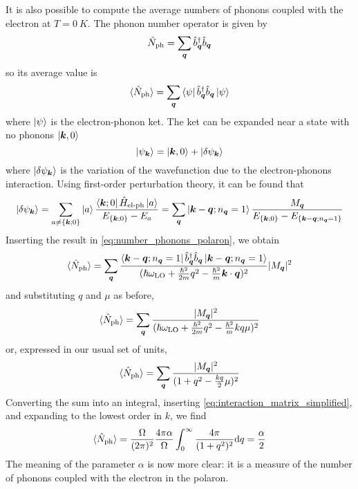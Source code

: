 It is also possible to compute the average numbers of phonons coupled with the electron at $T = \SI{0}{K}$. The phonon number operator is given by
\begin{equation}
    \hat{N}_\text{ph} = \sum_{\mathbf{\boldsymbol{q}}} \hat{b}^\dagger_{\mathbf{\boldsymbol{q}}} \hat{b}_{\mathbf{\boldsymbol{q}}}
\end{equation}
so its average value is
\begin{equation} \label{eq:number_phonons_polaron}
    \langle \hat{N}_\text{ph} \rangle = \sum_{\mathbf{\boldsymbol{q}}} \bra{\psi} \hat{b}^\dagger_{\mathbf{\boldsymbol{q}}} \hat{b}_{\mathbf{\boldsymbol{q}}} \ket{\psi}
\end{equation}
where $\ket{\psi}$ is the electron-phonon ket. The ket can be expanded near a state with no phonons $\ket{\mathbf{\boldsymbol{k}}, 0}$
\begin{equation}
    \ket{\psi_{\mathbf{\boldsymbol{k}}}} = \ket{\mathbf{\boldsymbol{k}}, 0} + \ket{\delta\psi_{\mathbf{\boldsymbol{k}}}}
\end{equation}
where $\ket{\delta\psi_{\mathbf{\boldsymbol{k}}}}$ is the variation of the wavefunction due to the electron-phonons interaction. Using first-order perturbation theory, it can be found that
\begin{equation} \label{eq:sum_integral}
    \ket{\delta\psi_{\mathbf{\boldsymbol{k}}}} = \sum_{a \neq \{\mathbf{\boldsymbol{k}};0\}} \ket{a} \frac{\bra{\mathbf{\boldsymbol{k}};0} \hat{H}_\text{el-ph} \ket{a}}{E_{\{\mathbf{\boldsymbol{k}};0\}} - E_a}
    = \sum_{\mathbf{\boldsymbol{q}}} \ket{\mathbf{\boldsymbol{k}}-\mathbf{\boldsymbol{q}};n_{\mathbf{\boldsymbol{q}}}=1} \frac{M_{\mathbf{\boldsymbol{q}}}}{E_{\{\mathbf{\boldsymbol{k}};0\}} - E_{\{\mathbf{\boldsymbol{k}}-\mathbf{\boldsymbol{q}};n_{\mathbf{\boldsymbol{q}}}=1\}}}
\end{equation}
Inserting the result in \cref{eq:number_phonons_polaron}, we obtain
\begin{equation}
    \langle \hat{N}_\text{ph} \rangle = \sum_{\mathbf{\boldsymbol{q}}} \frac{\bra{\mathbf{\boldsymbol{k}}-\mathbf{\boldsymbol{q}};n_{\mathbf{\boldsymbol{q}}}=1} \hat{b}^\dagger_{\mathbf{\boldsymbol{q}}} \hat{b}_{\mathbf{\boldsymbol{q}}} \ket{\mathbf{\boldsymbol{k}}-\mathbf{\boldsymbol{q}};n_{\mathbf{\boldsymbol{q}}}=1}}{(\hslash\omega_\text{LO} + \frac{\hslash^2}{2m}q^2 - \frac{\hslash^2}{m}\mathbf{\boldsymbol{k}}\cdot\mathbf{\boldsymbol{q}})^2} |M_{\mathbf{\boldsymbol{q}}}|^2
\end{equation}
and substituting $q$ and $\mu$ as before,
\begin{equation}
    \langle \hat{N}_\text{ph} \rangle = \sum_{\mathbf{\boldsymbol{q}}} \frac{|M_{\mathbf{\boldsymbol{q}}}|^2}{(\hslash\omega_\text{LO} + \frac{\hslash^2}{2m}q^2 - \frac{\hslash^2}{m} kq\mu)^2}
\end{equation}
or, expressed in our usual set of units,
\begin{equation}
    \langle \hat{N}_\text{ph} \rangle = \sum_{\mathbf{\boldsymbol{q}}} \frac{|M_{\mathbf{\boldsymbol{q}}}|^2}{(1 + q^2 - \frac{kq}{2}\mu)^2}
\end{equation}
Converting the sum into an integral, inserting \cref{eq:interaction_matrix_simplified}, and expanding to the lowest order in $k$, we find
\begin{equation}
    \langle \oper{N}_\text{ph} \rangle = \frac{\Omega}{(2\pi)^2} \frac{4\pi\alpha}{\Omega} \int_0^\infty \frac{4\pi}{(1+q^2)^2} \differential q = \frac{\alpha}{2}
\end{equation}
The meaning of the parameter $\alpha$ is now more clear: it is a measure of the number of phonons coupled with the electron in the polaron.


